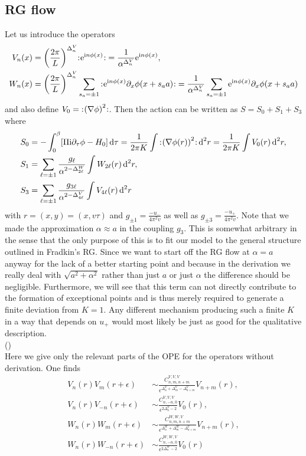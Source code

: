 \documentclass[english, parskip=full]{scrartcl}
\begin{document}
\subsection{RG flow}
Let us introduce the operators
\begin{align}
V_n(x) &= \kla*{\frac{2\pi}{L}}^{\Delta^V_n} \normord{\powe{\i n\phi(x)}}=\frac{1}{\alpha^{\Delta^V_n}} \powe{\i n\phi(x)},\\
W_n(x) &= \kla*{\frac{2\pi}{L}}^{\Delta^V_n} \sum_{s_a=\pm 1} \normord{\powe{\i n\phi(x)} \partial_x\phi(x+s_aa)} = \frac{1}{\alpha^{\Delta^V_n}} \sum_{s_a=\pm 1} \powe{\i n\phi(x)} \partial_x\phi(x+s_aa)
\end{align}
and also define $V_0=\normord{\kla*{\nabla\phi}^2}$.
Then the action can be written as $S=S_0+S_1+S_3$ where
\begin{align}
S_0 &= -\intx{0}{\beta}{\klb*{\Pi\i\partial_\tau\phi-H_0}}{\tau} = \frac{1}{2\pi K} \int \normord{\kla*{\nabla\phi(r)}^2}\,\d^2r = \frac{1}{2\pi K} \int V_0(r) \,\d^2r,\\
S_1 &= \sum_{\ell=\pm 1} \frac{g_{\ell}}{\alpha^{2-\Delta^W_{2\ell}}} \int W_{2\ell}(r)\,\d^2r,\\
S_3 &= \sum_{\ell=\pm 1} \frac{g_{3\ell}}{\alpha^{2-\Delta^V_{4\ell}}} \int V_{4\ell}(r)\,\d^2r
\end{align}
with $r=(x,y)=(x,v\tau)$ and $g_{\pm 1} = \frac{-u_-}{4\pi^2v}$ as well as $g_{\pm 3} = \frac{-u_+}{4\pi^2 v}$.
Note that we made the approximation $\alpha\approx a$ in the coupling $g_3$.
This is somewhat arbitrary in the sense that the only purpose of this is to fit our model to the general structure outlined in Fradkin's RG.
Since we want to start off the RG flow at $\alpha=a$ anyway for the lack of a better starting point and because in the derivation we really deal with $\sqrt{a^2+\alpha^2}$ rather than just $a$ or just $\alpha$ the difference should be negligible.
Furthermore, we will see that this term can not directly contribute to the formation of exceptional points and is thus merely required to generate a finite deviation from $K=1$.
Any different mechanism producing such a finite $K$ in a way that depends on $u_+$ would most likely be just as good for the qualitative description.\\
()\\
Here we give only the relevant parts of the OPE for the operators without derivation.
One finds
\begin{align}
V_n(r) V_m(r+\epsilon) &\sim \frac{C^{V,V,V}_{n,m,n+m}}{\epsilon^{\Delta^V_n + \Delta^V_m - \Delta^V_{n+m}}} V_{n+m}(r),\\
V_n(r) V_{-n}(r+\epsilon) &\sim \frac{C^{V,V,V}_{n,-n,0}}{\epsilon^{2\Delta^V_n - 2}} V_0(r),\\
W_n(r) W_m(r+\epsilon) &\sim \frac{C^{W,W,V}_{n,m,n+m}}{\epsilon^{\Delta^W_n + \Delta^W_m - \Delta^V_{n+m}}} V_{n+m}(r),\\
W_n(r) W_{-n}(r+\epsilon) &\sim \frac{C^{W,W,V}_{n,-n,0}}{\epsilon^{2\Delta^W_n - 2}} V_{0}(r)
\end{align}
\end{document}
